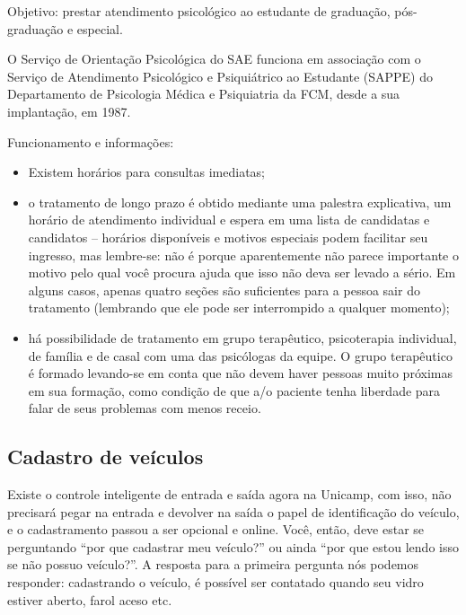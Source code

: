 Objetivo: prestar atendimento psicológico ao estudante de graduação,
pós-graduação e especial.

O Serviço de Orientação Psicológica do SAE funciona em associação com o Serviço
de Atendimento Psicológico e Psiquiátrico ao Estudante (SAPPE) do Departamento
de Psicologia Médica e Psiquiatria da FCM, desde a sua implantação, em 1987.

Funcionamento e informações:

\begin{itemize}
\item Existem horários para consultas imediatas; %

\item o tratamento de longo prazo é obtido mediante uma palestra explicativa,
  um horário de atendimento individual e espera em uma lista de candidatas e
  candidatos -- horários disponíveis e motivos especiais podem facilitar seu
  ingresso, mas lembre-se: não é porque aparentemente não parece importante o
  motivo pelo qual você procura ajuda que isso não deva ser levado a sério. Em
  alguns casos, apenas quatro seções são suficientes para a pessoa sair do
  tratamento (lembrando que ele pode ser interrompido a qualquer momento);

\item há possibilidade de tratamento em grupo terapêutico, psicoterapia
  individual, de família e de casal com uma das psicólogas da equipe. O grupo
  terapêutico é formado levando-se em conta que não devem haver pessoas muito
  próximas em sua formação, como condição de que a/o paciente tenha liberdade
  para falar de seus problemas com menos receio.
\end{itemize}

\subsection{Cadastro de veículos}

Existe o controle inteligente de entrada e saída agora na Unicamp, com isso,
não precisará pegar na entrada e devolver na saída o papel de identificação do
veículo, e o cadastramento passou a ser opcional e online. Você, então, deve
estar se perguntando ``por que cadastrar meu veículo?'' ou ainda ``por que
estou lendo isso se não possuo veículo?''. A resposta para a primeira pergunta
nós podemos responder: cadastrando o veículo, é possível ser contatado quando
seu vidro estiver aberto, farol aceso etc.

